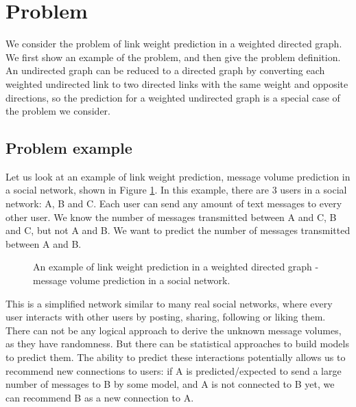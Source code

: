 \documentclass[11pt,twocolumn]{article}
\begin{document}
\section{Problem}
We consider the problem of link weight prediction in a weighted directed graph.
We first show an example of the problem,
and then give the problem definition.
An undirected graph can be reduced to a directed graph by converting each weighted undirected link to two directed links with the same weight and opposite directions,
so the prediction for a weighted undirected graph is a special case of the problem we consider.

\subsection{Problem example}
Let us look at an example of link weight prediction, message volume prediction in a social network, shown in Figure \ref{fig:example}.
In this example, there are 3 users in a social network: A, B and C.
Each user can send any amount of text messages to every other user.
We know the number of messages transmitted between A and C, B and C, but not A and B.
We want to predict the number of messages transmitted between A and B.
\begin{figure}[!htb]\centering
	\caption{
		An example of link weight prediction in a weighted directed graph -
		message volume prediction in a social network.
		}
	\label{fig:example}
\end{figure}

This is a simplified network similar to many real social networks, where every user interacts with other users by posting, sharing, following or liking them.
There can not be any logical approach to derive the unknown message volumes,
as they have randomness.
But there can be statistical approaches to build models to predict them.
The ability to predict these interactions potentially allows us to recommend new connections to users:
if A is predicted/expected to send a large number of messages to B by some model,
and A is not connected to B yet,
we can recommend B as a new connection to A.
\end{document}
